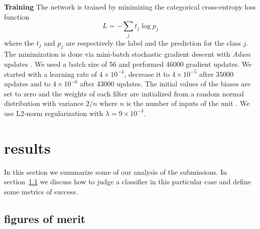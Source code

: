 \documentclass[useAMS,usenatbib]{mnras}
\begin{document}
{\bf Training}
The network is trained by minimizing the categorical cross-entropy loss function
\begin{equation}
L = -\sum_j t_{j}\log p_{j}
\label{EQloss}
\end{equation}
where the $t_j$ and $p_j$ are respectively the label and the prediction for the class $j$. 
The minimization is done via mini-batch stochastic gradient descent with \textit{Adam} updates \citep{Kingma_2014}. We used a batch size of 56 and performed  46000 gradient updates. We started with a learning rate of $4 \times 10^{-4}$, decrease it to $4 \times 10^{-5}$ after 35000 updates and to $4 \times 10^{-6}$ after 43000 updates.
The initial values of the biases are set to zero and the weights of each filter are initialized from a random normal distribution with variance ${2/n}$ where $n$ is the number of inputs of the unit \citep{He2015a}.  
We use L2-norm regularization with $\lambda= 9 \times 10^{-3}$.

\section{results}
\label{sec:results}

In this section we summarize some of our analysis of the submissions.  In section~\ref{sec:figure_of_merit} we discuss how to judge a classifier in this particular case and define some metrics of success.

\subsection{figures of merit}
\label{sec:figure_of_merit}
\end{document}
